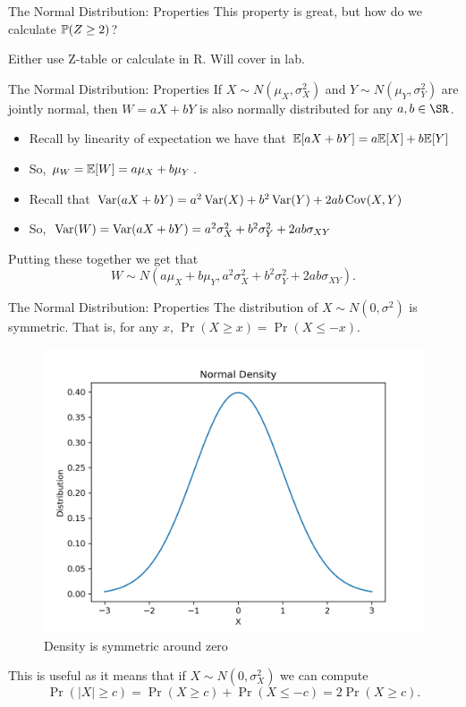 \documentclass[notheorems,9pt, handout]{beamer}
\begin{document}
\begin{frame}{The Normal Distribution: Properties} 
	\label{frame:nd-properties2}
	 This property is great, but how do we calculate \(\P(Z\geq 2)\)?	

	 Either use Z-table or calculate in R. Will cover in lab. 
\end{frame}
\begin{frame}{The Normal Distribution: Properties} 
	\label{frame:nd-properties3}
	 If \(X\sim N(\mu_X,\sigma_X^2)\) and \(Y\sim N(\mu_Y,\sigma_Y^2)\) are jointly normal, then \(W=aX+bY\) is also normally distributed for any \(a,b\in\SR\).

	\begin{itemize}
		\item Recall by linearity of expectation we have that \(\E[aX+bY] = a\E[X]+ b\E[Y]\)
		\item So, \(\mu_W = \E[W] = a\mu_X + b\mu_Y\).
	\end{itemize}
	\begin{itemize}
		\item Recall that \(\Var(aX+bY) = a^2\Var(X) + b^2\Var(Y) + 2ab\Cov(X,Y)\)
		\item So, \(\Var(W) = \Var(aX+bY) = a^2\sigma_X^2 + b^2\sigma_Y^2 + 2ab\sigma_{XY}\)
	\end{itemize}
	Putting these together we get that
	\[
		W\sim N\left(a\mu_X + b\mu_Y, a^2\sigma_X^2 + b^2\sigma_Y^2 + 2ab\sigma_{XY}\right)
	.\] 
\end{frame}
\begin{frame}{The Normal Distribution: Properties} 
	\label{frame:symmetry}
	 The distribution of \(X \sim N(0,\sigma^2)\) is symmetric. That is, for any \(x\), \(\Pr(X \geq x) = \Pr(X \leq -x)\).
	\begin{figure}[htpb]
		\centering
		\includegraphics[width=0.50\linewidth]{normal-density-standard.png}
		\caption{Density is symmetric around zero}%
	\end{figure}
	This is useful as it means that if \(X \sim N(0,\sigma_X^2)\) we can compute
	 \[
		 \Pr(|X|\geq c) = \Pr(X\geq c) + \Pr(X \leq -c) = 2\Pr(X\geq c)
	.\] 
\end{frame}
\end{document}
